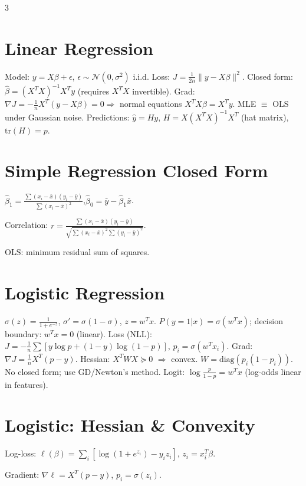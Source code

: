 \documentclass[8pt,fleqn]{extarticle}
\begin{document}
\tiny
\begin{multicols}{3}

\section*{Linear Regression}
Model: $y=X\beta+\epsilon$, $\epsilon\sim\mathcal N(0,\sigma^2)$ i.i.d.
Loss: $J=\frac1{2n}\|y-X\beta\|^2$.
Closed form: $\hat\beta=(X^TX)^{-1}X^Ty$ (requires $X^TX$ invertible).
Grad: $\nabla J=-\frac1nX^T(y-X\beta)=0\Rightarrow$ normal equations $X^TX\beta=X^Ty$.
MLE $\equiv$ OLS under Gaussian noise.
Predictions: $\hat y=H y$, $H=X(X^TX)^{-1}X^T$ (hat matrix), $\text{tr}(H)=p$.

\section*{Simple Regression Closed Form}

$\hat\beta_1=\frac{\sum(x_i-\bar x)(y_i-\bar y)}{\sum(x_i-\bar x)^2}$,\quad $\hat\beta_0=\bar y-\hat\beta_1\bar x$.

Correlation: $r=\frac{\sum(x_i-\bar x)(y_i-\bar y)}{\sqrt{\sum(x_i-\bar x)^2\sum(y_i-\bar y)^2}}$.

OLS: minimum residual sum of squares.


\section*{Logistic Regression}
$\sigma(z)=\frac1{1+e^{-z}}$, $\sigma'=\sigma(1-\sigma)$, $z=w^Tx$.
$P(y=1|x)=\sigma(w^Tx)$; decision boundary: $w^Tx=0$ (linear).
Loss (NLL): $J=-\frac1n\sum[y\log p+(1-y)\log(1-p)]$, $p_i=\sigma(w^Tx_i)$.
Grad: $\nabla J=\frac1nX^T(p-y)$. Hessian: $X^TWX\succeq0$ $\Rightarrow$ convex.
$W=\text{diag}(p_i(1-p_i))$. No closed form; use GD/Newton's method.
Logit: $\log\frac{p}{1-p}=w^Tx$ (log-odds linear in features).

\section*{Logistic: Hessian \& Convexity}

Log-loss: $\ell(\beta)=\sum_i[\log(1+e^{z_i})-y_iz_i]$, $z_i=x_i^T\beta$.

Gradient: $\nabla\ell=X^T(p-y)$, $p_i=\sigma(z_i)$.


\end{multicols}
\end{document}
